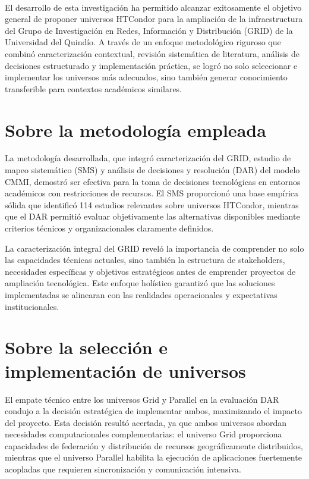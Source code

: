 \label{cap:conclusiones}
\mbox{}\\

El desarrollo de esta investigación ha permitido alcanzar exitosamente el objetivo general de proponer universos HTCondor para la ampliación de la infraestructura del Grupo de Investigación en Redes, Información y Distribución (GRID) de la Universidad del Quindío. A través de un enfoque metodológico riguroso que combinó caracterización contextual, revisión sistemática de literatura, análisis de decisiones estructurado y implementación práctica, se logró no solo seleccionar e implementar los universos más adecuados, sino también generar conocimiento transferible para contextos académicos similares.

\section{Sobre la metodología empleada}
\noindent

La metodología desarrollada, que integró caracterización del GRID, estudio de mapeo sistemático (SMS) y análisis de decisiones y resolución (DAR) del modelo CMMI, demostró ser efectiva para la toma de decisiones tecnológicas en entornos académicos con restricciones de recursos. El SMS proporcionó una base empírica sólida que identificó 114 estudios relevantes sobre universos HTCondor, mientras que el DAR permitió evaluar objetivamente las alternativas disponibles mediante criterios técnicos y organizacionales claramente definidos.

La caracterización integral del GRID reveló la importancia de comprender no solo las capacidades técnicas actuales, sino también la estructura de stakeholders, necesidades específicas y objetivos estratégicos antes de emprender proyectos de ampliación tecnológica. Este enfoque holístico garantizó que las soluciones implementadas se alinearan con las realidades operacionales y expectativas institucionales.

\section{Sobre la selección e implementación de universos}
\noindent

El empate técnico entre los universos Grid y Parallel en la evaluación DAR condujo a la decisión estratégica de implementar ambos, maximizando el impacto del proyecto. Esta decisión resultó acertada, ya que ambos universos abordan necesidades computacionales complementarias: el universo Grid proporciona capacidades de federación y distribución de recursos geográficamente distribuidos, mientras que el universo Parallel habilita la ejecución de aplicaciones fuertemente acopladas que requieren sincronización y comunicación intensiva.

